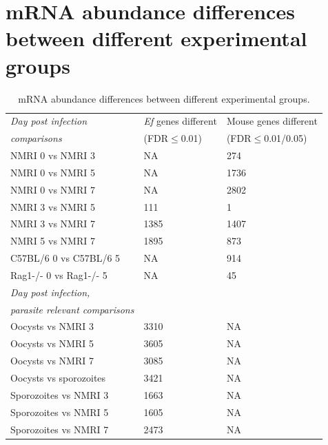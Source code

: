 \documentclass{bmcart}
\begin{document}



\clearpage
\section{mRNA abundance differences between different experimental groups}
\setlength{\tabcolsep}{8pt}
\begin{table}[H]
\small
\begin{center}
\caption{mRNA abundance differences between different experimental groups.}
\begin{tabular}{*3l}    \toprule
\textit{Day post infection} & \textit{Ef} genes different & Mouse genes different \\ 
	\textit{comparisons} 	    & (FDR$\leq$0.01) &  (FDR$\leq$0.01/0.05) \\ \midrule
	NMRI 0 vs NMRI 3		& NA   & 274 \\
	NMRI 0 vs NMRI 5		& NA   & 1736 \\
	NMRI 0 vs NMRI 7		& NA   & 2802 \\
	NMRI 3 vs NMRI 5     		& 111  & 1 \\
	NMRI 3 vs NMRI 7  		& 1385 & 1407 \\ 
	NMRI 5 vs NMRI 7  		& 1895 & 873 \\ 
	C57BL/6 0 vs C57BL/6 5		& NA	& 914 \\
	Rag1-/- 0 vs Rag1-/- 5		& NA	& 45 \\ \midrule
\textit{Day post infection,} & 		 & 		 \\ 
\textit{parasite relevant comparisons} 	    & 		&  \\ \midrule
	Oocysts vs NMRI 3  	& 3310 & NA \\  
	Oocysts vs NMRI 5	& 3605 & NA \\ 
	Oocysts vs NMRI 7	& 3085 & NA \\ 
	Oocysts vs sporozoites  & 3421 & NA \\
	Sporozoites vs NMRI 3 	& 1663 & NA \\
	Sporozoites vs NMRI 5 	& 1605 & NA \\
	Sporozoites vs NMRI 7 	& 2473 & NA \\ \midrule

\end{tabular}
\end{center}
\end{table}
\end{document}
